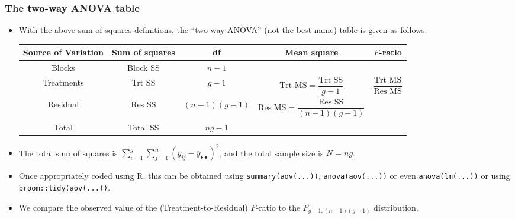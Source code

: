 \documentclass[a4paper]{article}
\begin{document}
\subsubsection{The two-way ANOVA table}
\begin{itemize}
	\item With the above sum of squares definitions, the ``two-way ANOVA'' (not the best name) table is given as follows:
	\begin{table}[H]
		\centering
		\begin{tabular}{@{}ccccc@{}}
		\toprule
		\textbf{Source of Variation} & \textbf{Sum of squares} & \textbf{df} & \textbf{Mean square} & \textbf{\( F \)-ratio} \\ \midrule
		Blocks     & Block SS & \( n-1        \) &  &  \\
		Treatments & Trt SS   & \( g-1        \) & \( \text{Trt MS} = \dfrac{\text{Trt SS}}{g-1} \) & \( \dfrac{\text{Trt MS}}{\text{Res MS}} \)  \\\addlinespace[0.5em]
		Residual   & Res SS   & \( (n-1)(g-1) \) & \( \text{Res MS} = \dfrac{\text{Res SS}}{(n-1)(g-1)} \) &  \\ \midrule
		Total      & Total SS & \( ng-1 \)       &  &  \\ \bottomrule
		\end{tabular}
	\end{table}
	\item The total sum of squares is \( \sum_{i=1}^g\sum_{j=1}^n(y_{ij}-\overline y_{\bullet\bullet})^2 \), and the total sample size is \( N = ng \).
	\item Once appropriately coded using R, this can be obtained using \lstinline|summary(aov(...))|, \lstinline|anova(aov(...))| or even \lstinline|anova(lm(...))| or using \lstinline|broom::tidy(aov(...))|.
	\item We compare the observed value of the (Treatment-to-Residual) \( F \)-ratio to the \( F_{g-1,(n-1)(g-1)} \) distribution.
\end{itemize}
\end{document}
